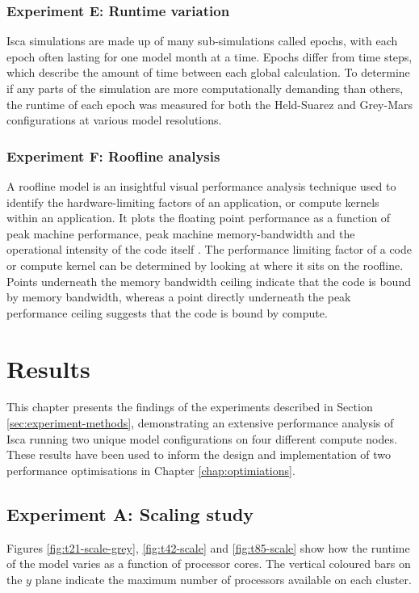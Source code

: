 \documentclass[a4paper,11pt]{report}
\begin{document}
\subsection{Experiment E: Runtime variation}
Isca simulations are made up of many sub-simulations called epochs, with each epoch often lasting for one model month at a time. Epochs differ from time steps, which describe the amount of time between each global calculation. To determine if any parts of the simulation are more computationally demanding than others, the runtime of each epoch was measured for both the Held-Suarez and Grey-Mars configurations at various model resolutions. 

\subsection{Experiment F: Roofline analysis}
A roofline model is an insightful visual performance analysis technique used to identify the hardware-limiting factors of an application, or compute kernels within an application. It plots the floating point performance as a function of peak machine performance, peak machine memory-bandwidth and the operational intensity of the code itself \cite{williams2009roofline}. The performance limiting factor of a code or compute kernel can be determined by looking at where it sits on the roofline. Points underneath the memory bandwidth ceiling indicate that the code is bound by memory bandwidth, whereas a point directly underneath the peak performance ceiling suggests that the code is bound by compute.


\chapter{Results}
\label{chap:results}
This chapter presents the findings of the experiments described in Section \ref{sec:experiment-methods}, demonstrating an extensive performance analysis of Isca running two unique model configurations on four different compute nodes. These results have been used to inform the design and implementation of two performance optimisations in Chapter \ref{chap:optimiations}. 
\section{Experiment A: Scaling study} 
Figures \ref{fig:t21-scale-grey}, \ref{fig:t42-scale} and \ref{fig:t85-scale} show how the runtime of the model varies as a function of processor cores. The vertical coloured bars on the $y$ plane indicate the maximum number of processors available on each cluster.
\end{document}
